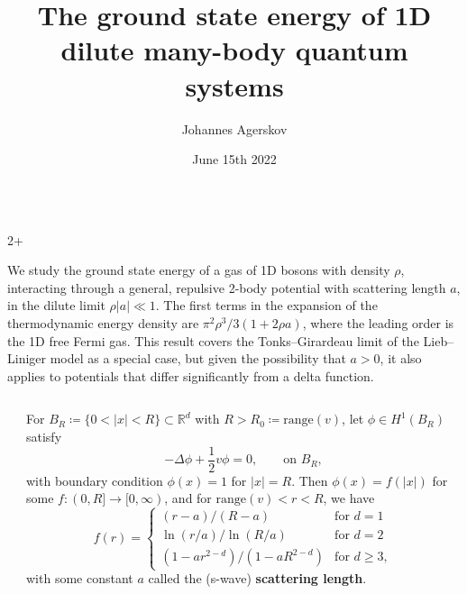 \documentclass[final]{beamer}
\title{The ground state energy of 1D dilute many-body quantum systems}
\author{Johannes Agerskov}
\institute{QMATH \\ University of Copenhagen}
\date{June 15th 2022}
\newcommand{\abs}[1]{\left\lvert #1 \right\rvert}
\newcommand{\R}{\mathbb{R}}
\newlength{\sepwidth}
\newlength{\colwidth}
\newcommand{\separatorcolumn}{\begin{column}{\sepwidth}\end{column}}
\begin{document}
	\begin{frame}[t]
		\begin{columns}[t]
			
			\begin{column}{2\colwidth+\sepwidth}
				\begin{tcolorbox}[colframe=kugreen,colback=kugreenlyslyslys,title=\centering Abstract]
					We study the ground state energy of a gas of 1D bosons with density $\rho$, interacting through a general, repulsive 2-body potential with scattering length $a$, in the dilute limit $\rho |a|\ll1$. The first terms in the expansion of the thermodynamic energy density are $\pi^2\rho^3/3(1+2\rho a)$, where the leading order is the 1D free Fermi gas. This result covers the Tonks--Girardeau limit of the Lieb--Liniger model as a special case, but given the possibility that $a>0$, it also applies to potentials that differ significantly from a delta function.
				\end{tcolorbox}
			\end{column}
			
		\end{columns}
		
	\begin{columns}[t]
		\separatorcolumn
		
		\begin{column}{\colwidth}
		\begin{tcolorbox}[colframe=kugreen,colback=kugreenlyslyslys,title=Set up and previous results]
			
		\end{tcolorbox}
		
		\begin{tcolorbox}[colframe=kugreen,colback=kugreenlyslyslys,title=The scattering length]
			\begin{theorem}
				For $ B_R\coloneqq\{0<\abs{x}<R\}\subset \R^d $ with $ R>R_0\coloneqq\text{range}(v) $, let $ \phi\in H^1(B_{R}) $ satisfy
				\begin{equation}
				-\Delta \phi +\frac12 v\phi=0,\qquad \text{on }B_R,
				\end{equation}
				with boundary condition $ \phi(x)=1 $ for $ \abs{x}=R$.
				Then $ \phi(x)=f(\abs{x}) $ for some $ f:(0,R]\to [0,\infty) $, and for $ \text{range}(v)<r<R $, we have \begin{equation}
				f(r)=\begin{cases}
				(r-a)/(R-a) &\text{for }d=1\\
				\ln(r/a)/\ln(R/a) &\text{for }d=2\\
				(1-ar^{2-d})/(1-aR^{2-d})&\text{for }d\geq 3,
				\end{cases}
				\end{equation}
				with some constant $ a $ called the (s-wave) \textbf{scattering length}.
			\end{theorem}
			

\end{tcolorbox}
\end{column}
\end{columns}
\end{frame}
\end{document}
